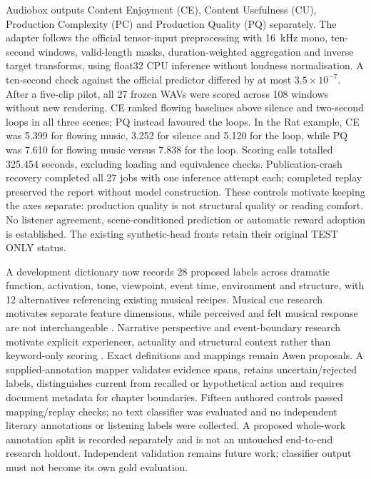 \documentclass[11pt]{article}
\begin{document}
Audiobox outputs Content Enjoyment (CE), Content Usefulness (CU), Production Complexity (PC) and Production Quality (PQ) separately. The adapter follows the official tensor-input preprocessing with 16~kHz mono, ten-second windows, valid-length masks, duration-weighted aggregation and inverse target transforms, using float32 CPU inference without loudness normalisation. A ten-second check against the official predictor differed by at most $3.5\times10^{-7}$. After a five-clip pilot, all 27 frozen WAVs were scored across 108 windows without new rendering. CE ranked flowing baselines above silence and two-second loops in all three scenes; PQ instead favoured the loops. In the Rat example, CE was 5.399 for flowing music, 3.252 for silence and 5.120 for the loop, while PQ was 7.610 for flowing music versus 7.838 for the loop. Scoring calls totalled 325.454 seconds, excluding loading and equivalence checks. Publication-crash recovery completed all 27 jobs with one inference attempt each; completed replay preserved the report without model construction. These controls motivate keeping the axes separate: production quality is not structural quality or reading comfort. No listener agreement, scene-conditioned prediction or automatic reward adoption is established. The existing synthetic-head fronts retain their original TEST ONLY status.

A development dictionary now records 28 proposed labels across dramatic function, activation, tone, viewpoint, event time, environment and structure, with 12 alternatives referencing existing musical recipes. Musical cue research motivates separate feature dimensions, while perceived and felt musical response are not interchangeable \cite{eerola,zentner}. Narrative perspective and event-boundary research motivate explicit experiencer, actuality and structural context rather than keyword-only scoring \cite{niederhoff,speer}. Exact definitions and mappings remain Awen proposals. A supplied-annotation mapper validates evidence spans, retains uncertain/rejected labels, distinguishes current from recalled or hypothetical action and requires document metadata for chapter boundaries. Fifteen authored controls passed mapping/replay checks; no text classifier was evaluated and no independent literary annotations or listening labels were collected. A proposed whole-work annotation split is recorded separately and is not an untouched end-to-end research holdout. Independent validation remains future work; classifier output must not become its own gold evaluation.
\end{document}
